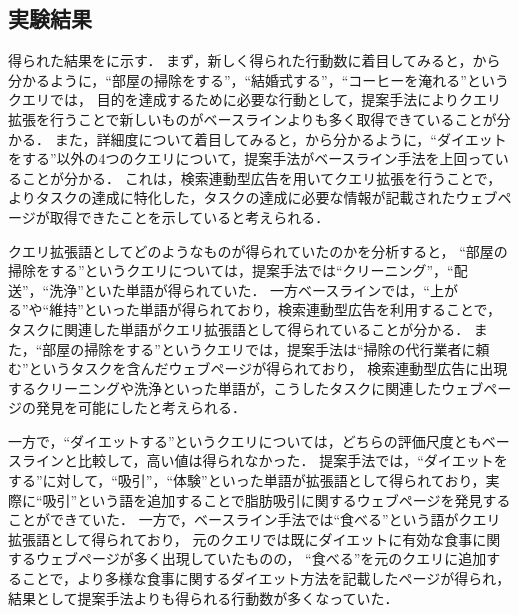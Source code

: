 \documentclass[submit,techreq]{ipsj}
\begin{document}
\subsection{実験結果}
\label{sec:result}
得られた結果をに示す．
まず，新しく得られた行動数に着目してみると，から分かるように，``部屋の掃除をする''，``結婚式する''，``コーヒーを淹れる''というクエリでは，
目的を達成するために必要な行動として，提案手法によりクエリ拡張を行うことで新しいものがベースラインよりも多く取得できていることが分かる．
また，詳細度について着目してみると，から分かるように，``ダイエットをする''以外の4つのクエリについて，提案手法がベースライン手法を上回っていることが分かる．
これは，検索連動型広告を用いてクエリ拡張を行うことで，よりタスクの達成に特化した，タスクの達成に必要な情報が記載されたウェブページが取得できたことを示していると考えられる．

クエリ拡張語としてどのようなものが得られていたのかを分析すると，
``部屋の掃除をする''というクエリについては，提案手法では``クリーニング''，``配送''，``洗浄''といた単語が得られていた．
一方ベースラインでは，``上がる''や``維持''といった単語が得られており，検索連動型広告を利用することで，
タスクに関連した単語がクエリ拡張語として得られていることが分かる．
また，``部屋の掃除をする''というクエリでは，提案手法は``掃除の代行業者に頼む''というタスクを含んだウェブページが得られており，
検索連動型広告に出現するクリーニングや洗浄といった単語が，こうしたタスクに関連したウェブページの発見を可能にしたと考えられる．


一方で，``ダイエットする''というクエリについては，どちらの評価尺度ともベースラインと比較して，高い値は得られなかった．
提案手法では，``ダイエットをする''に対して，``吸引''，``体験''といった単語が拡張語として得られており，実際に``吸引''という語を追加することで脂肪吸引に関するウェブページを発見することができていた．
一方で，ベースライン手法では``食べる''という語がクエリ拡張語として得られており，
元のクエリでは既にダイエットに有効な食事に関するウェブページが多く出現していたものの，
``食べる''を元のクエリに追加することで，より多様な食事に関するダイエット方法を記載したページが得られ，
結果として提案手法よりも得られる行動数が多くなっていた．
\end{document}
